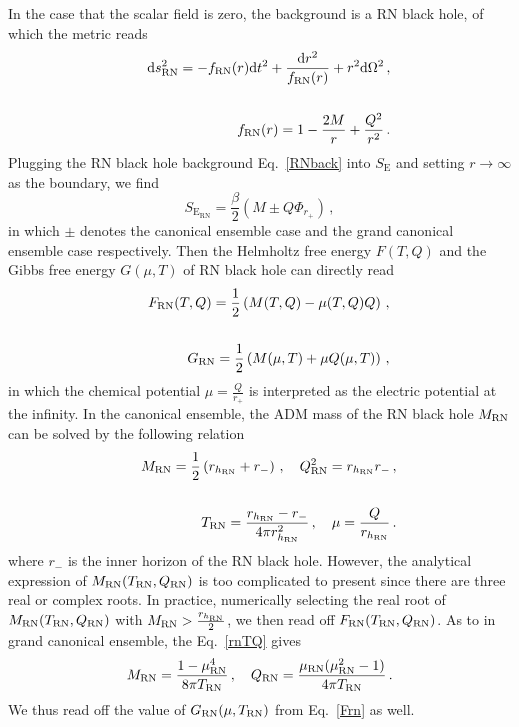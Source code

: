 \documentclass[pr, twocolumn, preprintnumbers, showpacs,footnoteadded, superscriptaddress,nofootinbib,longbibliography]{revtex4-1}
\newcommand{\td}{\mathrm{d}}
\begin{document}
In the case that the scalar field is zero, the background is a RN black hole, of which the metric reads
%
\begin{eqnarray} \label{RNback}
&&\td s_{\text{RN}}^2= -f_{\text{RN}}(r)\td t^2+\frac{\td r^2}{f_{\text{RN}}(r)}+r^2 \td \Omega^2 \, , \cr
~\cr
&&f_{\text{RN}}(r)=1-\frac{2M}{r}+\frac{Q^2}{r^2}\, .
\end{eqnarray}
%
Plugging the RN black hole background Eq.~\eqref{RNback} into $S_{\text{E}}$ and setting $r \to \infty$ as the boundary, we find
%
\begin{equation}\label{EacRN}
S_{\text{E}_{\text{RN}}}=\frac{\beta}{2}(M \pm Q\Phi_{r_+})\, ,
\end{equation}
%
in which $\pm$ denotes the canonical ensemble case and the grand canonical ensemble case respectively. Then the Helmholtz free energy $F(T,Q)$ and the Gibbs free energy $G(\mu,T)$ of RN black hole can directly read
%
\begin{eqnarray}\label{Frn}
&&F_{\text{RN}}(T,Q)=\frac{1}{2}\left(M(T,Q) - \mu (T,Q) Q\right) \, , \\
~\cr
&&G_{\text{RN}}=\frac{1}{2}\left(M(\mu,T) + \mu Q(\mu,T)  \right)\, ,
\end{eqnarray}
%
in which the chemical potential $\mu= \frac{Q}{r_+} $ is interpreted as the electric potential at the infinity. In the canonical ensemble, the ADM mass of the RN black hole $M_{\rm RN}$ can be solved by the following relation
%
\begin{eqnarray} \label{rnTQ}
&& M_{\rm RN}=\frac{1}{2}\left(r_{h_{\rm RN}} + r_-\right) \, , \quad Q_{\rm RN}^2 =r_{h_{\rm RN}} r_- \, , \cr
 ~\cr
&& T_{\rm RN}=\frac{r_{h_{\rm RN}} - r_-}{4\pi r_{h_{\rm RN}}^2}\, ,\quad \mu=\frac{Q}{r_{h_{\rm RN}}}\, .
\end{eqnarray}
%
where $r_-$ is the inner horizon of the RN black hole. However, the analytical expression of $M_{\rm RN}(T_{\rm RN},Q_{\rm RN})$ is too complicated to present since there are three real or complex roots. In practice, numerically selecting the real root of $M_{\rm RN}(T_{\rm RN}, Q_{\rm RN})$ with $M_{\rm RN}>\frac{r_{h_{\rm RN}}}{2}$, we then read off $F_{\rm RN}(T_{\rm RN},Q_{\rm RN})$. As to in grand canonical ensemble, the Eq.~\eqref{rnTQ} gives
%
\begin{equation}\label{rnmuT}
M_{\rm RN}=\frac{1- \mu_{\rm RN}^4}{8 \pi T_{\rm RN}} \, , \quad Q_{\rm RN}=\frac{\mu_{\rm RN}(\mu_{\rm RN}^2-1)}{4\pi T_{\rm RN}}\, .
\end{equation}
%
We thus read off the value of $G_{\rm RN}(\mu,T_{\rm RN})$ from Eq.~\eqref{Frn} as well.
\end{document}
